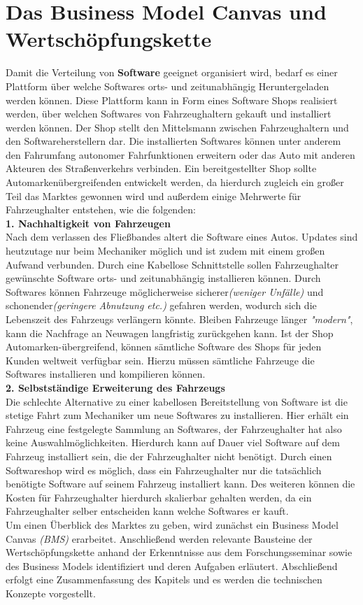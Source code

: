 \section{Das Business Model Canvas und Wertschöpfungskette}\label{markt}
Damit die Verteilung von \textbf{Software} geeignet organisiert wird, bedarf es einer Plattform über welche Softwares orts- und zeitunabhängig Heruntergeladen werden können. Diese Plattform kann in Form eines Software Shops realisiert werden, über welchen Softwares von Fahrzeughaltern gekauft und installiert werden können. Der Shop stellt den Mittelsmann zwischen Fahrzeughaltern und den Softwareherstellern dar. Die installierten Softwares können unter anderem den Fahrumfang autonomer Fahrfunktionen erweitern oder das Auto mit anderen Akteuren des Straßenverkehrs verbinden. Ein bereitgestellter Shop sollte Automarkenübergreifenden entwickelt werden, da hierdurch zugleich ein großer Teil das Marktes gewonnen wird und außerdem einige Mehrwerte für Fahrzeughalter entstehen, wie die folgenden:\\

\textbf{1. Nachhaltigkeit von Fahrzeugen}\\
Nach dem verlassen des Fließbandes altert die Software eines Autos. Updates sind heutzutage nur beim Mechaniker möglich und ist zudem mit einem großen Aufwand verbunden. Durch eine Kabellose Schnittstelle sollen Fahrzeughalter gewünschte Software orts- und zeitunabhängig installieren können. Durch Softwares können Fahrzeuge möglicherweise sicherer\textit{(weniger Unfälle)} und schonender\textit{(geringere Abnutzung etc.)} gefahren werden, wodurch sich die Lebenszeit des Fahrzeugs verlängern könnte. Bleiben Fahrzeuge länger \textit{"modern"}, kann die Nachfrage an Neuwagen langfristig zurückgehen kann. Ist der Shop Automarken-übergreifend, können sämtliche Software des Shops für jeden Kunden weltweit verfügbar sein. Hierzu müssen sämtliche Fahrzeuge die Softwares installieren und kompilieren können.\\


\textbf{2. Selbstständige Erweiterung des Fahrzeugs}\\
Die schlechte Alternative zu einer kabellosen Bereitstellung von Software ist die stetige Fahrt zum Mechaniker um neue Softwares zu installieren. Hier erhält ein Fahrzeug eine festgelegte Sammlung an Softwares, der Fahrzeughalter hat also keine Auswahlmöglichkeiten. Hierdurch kann auf Dauer viel Software auf dem Fahrzeug installiert sein, die der Fahrzeughalter nicht benötigt. Durch einen Softwareshop wird es möglich, dass ein Fahrzeughalter nur die tatsächlich benötigte Software auf seinem Fahrzeug installiert kann. Des weiteren können die Kosten für Fahrzeughalter hierdurch skalierbar gehalten werden, da ein Fahrzeughalter selber entscheiden kann welche Softwares er kauft.\\

Um einen Überblick des Marktes zu geben, wird zunächst ein Business Model Canvas \textit{(BMS)} erarbeitet. Anschließend werden relevante Bausteine der Wertschöpfungskette anhand der Erkenntnisse aus dem Forschungsseminar sowie des Business Models identifiziert und deren Aufgaben erläutert. Abschließend erfolgt eine Zusammenfassung des Kapitels und es werden die technischen Konzepte vorgestellt.